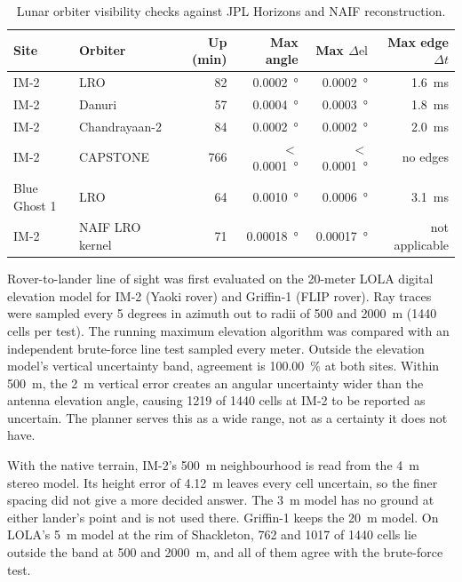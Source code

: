 \documentclass[11pt,a4paper]{article}
\begin{document}
\begin{table}[htbp]
\centering\small
\caption{Lunar orbiter visibility checks against JPL Horizons and NAIF reconstruction.}
\label{tab:orbiters}
\begin{tabular}{@{}llrrrr@{}}
\toprule
Site & Orbiter & Up (\unit{\minute}) & Max angle & Max $\Delta\text{el}$ & Max edge $\Delta t$ \\
\midrule
IM-2 & LRO & 82 & \qty{0.0002}{\degree} & \qty{0.0002}{\degree} & \qty{1.6}{\ms} \\
IM-2 & Danuri & 57 & \qty{0.0004}{\degree} & \qty{0.0003}{\degree} & \qty{1.8}{\ms} \\
IM-2 & Chandrayaan-2 & 84 & \qty{0.0002}{\degree} & \qty{0.0002}{\degree} & \qty{2.0}{\ms} \\
IM-2 & CAPSTONE & 766 & $<$\qty{0.0001}{\degree} & $<$\qty{0.0001}{\degree} & no edges \\
Blue Ghost 1 & LRO & 64 & \qty{0.0010}{\degree} & \qty{0.0006}{\degree} & \qty{3.1}{\ms} \\
IM-2 & NAIF LRO kernel & 71 & \qty{0.00018}{\degree} & \qty{0.00017}{\degree} & not applicable \\
\bottomrule
\end{tabular}
\end{table}

Rover-to-lander line of sight was first evaluated on the 20-meter LOLA digital elevation model
for IM-2 (Yaoki rover) and Griffin-1 (FLIP rover). Ray traces were sampled every 5 degrees
in azimuth out to radii of 500 and \qty{2000}{\m} (\num{1440} cells per test). The running
maximum elevation algorithm was compared with an independent brute-force line test sampled
every meter. Outside the elevation model's vertical uncertainty band, agreement is
\qty{100.00}{\percent} at both sites. Within \qty{500}{\m},
the \qty{2}{\m} vertical error creates an angular uncertainty wider than the antenna
elevation angle, causing \num{1219} of \num{1440} cells at IM-2 to be reported as uncertain. The
planner serves this as a wide range, not as a certainty it does not have.

With the native terrain, IM-2's \qty{500}{\m} neighbourhood is read from the \qty{4}{\m} stereo
model. Its height error of \qty{4.12}{\m} leaves every cell uncertain, so the finer spacing did
not give a more decided answer. The \qty{3}{\m} model has no ground at either lander's point and
is not used there. Griffin-1 keeps the \qty{20}{\m} model. On LOLA's \qty{5}{\m} model at the rim
of Shackleton, 762 and \num{1017} of \num{1440} cells lie outside the band at 500 and
\qty{2000}{\m}, and all of them agree with the brute-force test.
\end{document}
